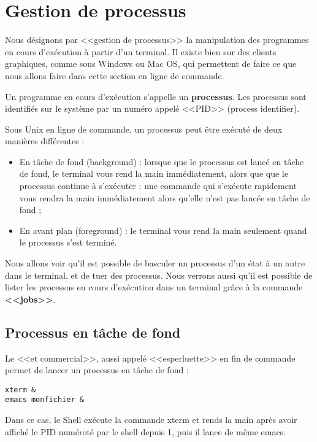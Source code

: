 \documentclass[11pt]{article}
\begin{document}
\section{Gestion de processus}

Nous désignons par <<gestion de processus>> la manipulation des programmes en cours d’exécution à partir
d’un terminal. Il existe bien sur des clients graphiques, comme sous Windows ou Mac OS, qui permettent de
faire ce que nous allons faire dans cette section en ligne de commande.

Un programme en cours d’exécution s’appelle un \textbf{processus}. Les processus sont identifiés sur le système par un numéro appelé <<PID>> (process identifier).

Sous Unix en ligne de commande, un processus peut être exécuté de deux manières différentes :

\begin{itemize}
 \item En tâche de fond (background) : lorsque que le processus est lancé en tâche de fond, le terminal
vous rend la main immédiatement, alors que que le processus continue à s’exécuter : une commande qui
s’exécute rapidement vous rendra la main immédiatement alors qu’elle n’est pas lancée en tâche de fond ;
 \item En avant plan (foreground) : le terminal vous rend la main seulement quand le processus
s’est terminé.
\end{itemize}

Nous allons voir qu’il est possible de basculer un processus d’un état à un autre dans le terminal, et de tuer
des processus. Nous verrons aussi qu’il est possible de lister les processus en cours d’exécution dans un
terminal grâce à la commande \textbf{<<jobs>>}.

\subsection{Processus en tâche de fond}

Le <<et commercial>>, aussi appelé <<esperluette>> en fin de commande permet de lancer un processus en tâche de fond :

\begin{lstlisting}
xterm &
emacs monfichier &
\end{lstlisting}

Dans ce cas, le Shell exécute la commande xterm et rends la main après avoir affiché le PID numéroté par le shell depuis 1, puis il lance de même emacs.
\end{document}

